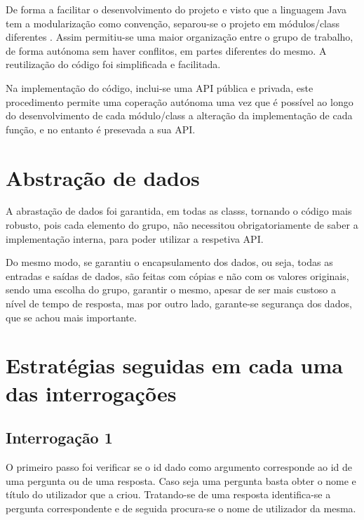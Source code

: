 \documentclass[11pt,a4paper]{article}
\begin{document}
\label{sec:modularizacaoFuncional}

De forma a facilitar o desenvolvimento do projeto e visto que a linguagem Java tem a modularização como convenção, separou-se o projeto em módulos/class diferentes . Assim permitiu-se uma maior organização entre o grupo de trabalho, de forma autónoma sem haver conflitos, em partes diferentes do mesmo. A reutilização do código foi simplificada e facilitada.\newline

Na implementação do código, inclui-se uma API pública e privada, este procedimento permite uma coperação autónoma uma vez que é possível ao longo do desenvolvimento de cada módulo/class a alteração da implementação de cada função, e no entanto é presevada a sua API.

\newpage
\section{Abstração de dados}

\label{sec:abstracaoDeDados}

A abrastação de dados foi garantida, em todas as classs, tornando o código mais robusto, pois cada elemento do grupo, não necessitou obrigatoriamente de saber a implementação interna, para poder utilizar a respetiva API.\newline

Do mesmo modo, se garantiu o encapsulamento dos dados, ou seja, todas as entradas e saídas de dados, são feitas com cópias e não com os valores originais, sendo uma escolha do grupo, garantir o mesmo, apesar de ser mais custoso a nível de tempo de resposta, mas por outro lado, garante-se segurança dos dados, que se achou mais importante.


\newpage
\section{Estratégias seguidas em cada uma das interrogações}

\label{sec:estrategiasSeguidasEmCadaUmaDasInterrogacoes}

\subsection{Interrogação 1}

O primeiro passo foi verificar se o id dado como argumento corresponde ao id de uma pergunta ou de uma resposta. Caso seja uma pergunta basta obter o nome e título do utilizador que a criou. Tratando-se de uma resposta identifica-se a pergunta correspondente e de seguida procura-se o nome de utilizador da mesma.
\end{document}
